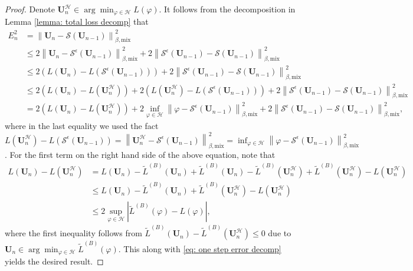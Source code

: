 \documentclass[twoside,11pt]{article}
\newcommand{\bU}{\mathbf{U}}
\newcommand{\1}{\mathbf{1}}
\numberwithin{equation}{section}
\newcommand{\normmix}[1]{\left\|#1\right\|_{\beta, \text{mix}}}
\begin{document}
\begin{proof}
    Denote $\bU^{\mathcal{H}}_n \in \arg\min_{\varphi\in \mathcal{H}} L(\varphi)$. It follows from the decomposition in Lemma \ref{lemma: total loss decomp} that
    \begin{equation}\label{eq: one step error decomp}
    \begin{aligned}
        E_n^2  &= \normmix{\bU_n - \mathcal{S}(\mathbf{U}_{n-1})}^2 \\
        &\le 2\normmix{\bU_n - \mathcal{S}^\epsilon(\mathbf{U}_{n-1})}^2 + 2\normmix{\mathcal{S}^\epsilon(\mathbf{U}_{n-1}) - \mathcal{S}(\mathbf{U}_{n-1})}^2\\
        & \le 2(L(\bU_n) - L(\mathcal{S}^\epsilon(\mathbf{U}_{n-1}))) + 2\normmix{\mathcal{S}^\epsilon(\mathbf{U}_{n-1}) - \mathcal{S}(\mathbf{U}_{n-1})}^2\\
        &\le 2(L(\bU_n) - L(\bU^{\mathcal{H}}_n)) + 2(L(\bU^{\mathcal{H}}_n) -  L(\mathcal{S}^\epsilon(\mathbf{U}_{n-1}))) + 2\normmix{\mathcal{S}^\epsilon(\mathbf{U}_{n-1}) - \mathcal{S}(\mathbf{U}_{n-1})}^2\\
        & = 2(L(\bU_n) - L(\bU^{\mathcal{H}}_n)) + 2 \inf_{\varphi\in \mathcal{H}} \normmix{\varphi - \mathcal{S}^\epsilon(\mathbf{U}_{n-1})}^2 + 2\normmix{\mathcal{S}^\epsilon(\mathbf{U}_{n-1}) - \mathcal{S}(\mathbf{U}_{n-1})}^2,
    \end{aligned}
    \end{equation}
    where in the last equality we used the fact $L(\bU^{\mathcal{H}}_n) -  L(\mathcal{S}^\epsilon(\mathbf{U}_{n-1})) = \normmix{\bU^{\mathcal{H}}_n - \mathcal{S}^\epsilon(\mathbf{U}_{n-1})}^2 =  \inf_{\varphi\in \mathcal{H}} \normmix{\varphi - \mathcal{S}^\epsilon(\mathbf{U}_{n-1})}^2$. For the first term on the right hand side of the above equation, note that
    \begin{align*}
        L(\bU_n) - L(\bU^{\mathcal{H}}_n) &= L(\bU_n) - \tilde L^{(B)}(\bU_n) + \tilde L^{(B)}(\bU_n) - \tilde L^{(B)}(\bU^{\mathcal{H}}_n) +  \tilde L^{(B)}(\bU^{\mathcal{H}}_n) - L(\bU^{\mathcal{H}}_n)\\
        & \le L(\bU_n) - \tilde L^{(B)}(\bU_n) + \tilde L^{(B)}(\bU^{\mathcal{H}}_n) - L(\bU^{\mathcal{H}}_n)\\
        & \le 2\sup_{\varphi \in \mathcal{H}} |\tilde L^{(B)}(\varphi) - L(\varphi)|,
    \end{align*}
    where the first inequality follows from $\tilde L^{(B)}(\bU_n) - \tilde L^{(B)}(\bU^{\mathcal{H}}_n) \le 0$ due to $\bU_n \in \arg\min_{\varphi \in \mathcal{H}} \tilde L^{(B)}(\varphi)$. This along with \eqref{eq: one step error decomp} yields the desired result.
\end{proof}
\end{document}
